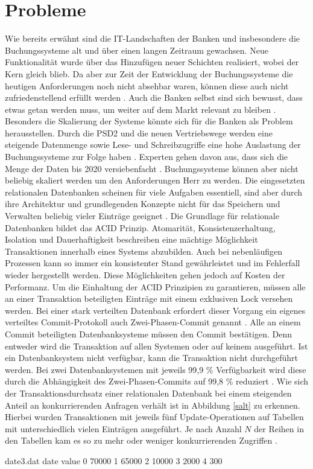 \documentclass[12pt,oneside,a4paper,parskip]{scrbook}
\begin{document}
\section{Probleme}
Wie bereits erwähnt sind die IT-Landschaften der Banken und insbesondere die Buchungssysteme alt und über einen langen Zeitraum gewachsen. Neue Funktionalität wurde über das Hinzufügen neuer Schichten realisiert, wobei der Kern gleich blieb. Da aber zur Zeit der Entwicklung der Buchungssysteme die heutigen Anforderungen noch nicht absehbar waren, können diese auch nicht zufriedenstellend erfüllt werden \cite[23-27]{ITidF}\cite{bankEnzy}. Auch die Banken selbst sind sich bewusst, dass etwas getan werden muss, um weiter auf dem Markt relevant zu bleiben \cite{capgemini}.
Besonders die Skalierung der Systeme könnte sich für die Banken als Problem herausstellen. Durch die PSD2 und die neuen Vertriebswege werden eine steigende Datenmenge sowie Lese- und Schreibzugriffe eine hohe Auslastung der Buchungssysteme zur Folge haben \cite{bigdataBigStorage}. Experten gehen davon aus, dass sich die Menge der Daten bis 2020 versiebenfacht \cite{versiebenfacht}. Buchungssysteme können aber nicht beliebig skaliert werden um den Anforderungen Herr zu werden. Die eingesetzten relationalen Datenbanken scheinen für viele Aufgaben essentiell, sind aber durch ihre Architektur und grundlegenden Konzepte nicht für das Speichern und Verwalten beliebig vieler Einträge geeignet \cite{rdbmsBigData}. Die Grundlage für relationale Datenbanken bildet das ACID Prinzip. Atomarität, Konsistenzerhaltung, Isolation und Dauerhaftigkeit beschreiben eine mächtige Möglichkeit Transaktionen innerhalb eines Systems abzubilden. Auch bei nebenläufigen Prozessen kann so immer ein konsistenter Stand gewährleistet und im Fehlerfall wieder hergestellt werden. Diese Möglichkeiten gehen jedoch auf Kosten der Performanz. Um die Einhaltung der ACID Prinzipien zu garantieren, müssen alle an einer Transaktion beteiligten Einträge mit einem exklusiven Lock versehen werden. Bei einer stark verteilten Datenbank erfordert dieser Vorgang ein eigenes verteiltes Commit-Protokoll auch Zwei-Phasen-Commit genannt \cite{dbarchitecture}. Alle an einem Commit beteiligten Datenbanksysteme müssen den Commit bestätigen. Denn entweder wird die Transaktion auf allen Systemen oder auf keinem ausgeführt. Ist ein Datenbanksystem nicht verfügbar, kann die Transaktion nicht durchgeführt werden. Bei zwei Datenbanksystemen mit jeweils 99,9 \% Verfügbarkeit wird diese durch die Abhängigkeit des Zwei-Phasen-Commits auf 99,8 \% reduziert \cite{BASE}. Wie sich der Transaktionsdurchsatz einer relationalen Datenbank bei einem steigenden Anteil an konkurrierenden Anfragen verhält ist in Abbildung \ref{salt} zu erkennen. Hierbei wurden Transaktionen mit jeweils fünf Update-Operationen auf Tabellen mit unterschiedlich vielen Einträgen ausgeführt. Je nach Anzahl $N$ der Reihen in den Tabellen kam es so zu mehr oder weniger konkurrierenden Zugriffen \cite{salt}.
\begin{filecontents}{date3.dat}
date  value
0     70000
1     65000
2     10000
3     2000
4     300
\end{filecontents}
\end{document}
